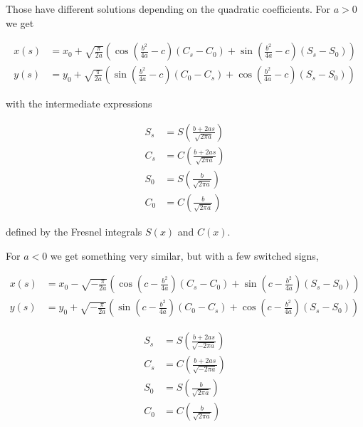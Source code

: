 Those have different solutions depending on the quadratic coefficients.
For $a > 0$ we get

\begin{align}
x(s) &= x_0 + \sqrt{\frac{\pi}{2a}}\left(\cos\left(\frac{b^2}{4a} - c\right)(C_s - C_0) + \sin\left(\frac{b^2}{4a} - c\right)(S_s - S_0)\right) \\
y(s) &= y_0 + \sqrt{\frac{\pi}{2a}}\left(\sin\left(\frac{b^2}{4a} - c\right)(C_0 - C_s) + \cos\left(\frac{b^2}{4a} - c\right)(S_s - S_0)\right)
\end{align}

with the intermediate expressions

\begin{align}
S_s &= S\left(\frac{b + 2as}{\sqrt{2\pi a}}\right) \\
C_s &= C\left(\frac{b + 2as}{\sqrt{2\pi a}}\right) \\
S_0 &= S\left(\frac{b}{\sqrt{2\pi a}}\right) \\
C_0 &= C\left(\frac{b}{\sqrt{2\pi a}}\right)
\end{align}

defined by the Fresnel integrals $S(x)$ and $C(x)$.

For $a < 0$ we get something very similar, but with a few switched signs,

\begin{align}
x(s) &= x_0 - \sqrt{-\frac{\pi}{2a}}\left(\cos\left(c - \frac{b^2}{4a}\right)(C_s - C_0) + \sin\left(c - \frac{b^2}{4a}\right)(S_s - S_0)\right) \\
y(s) &= y_0 + \sqrt{-\frac{\pi}{2a}}\left(\sin\left(c - \frac{b^2}{4a}\right)(C_0 - C_s) + \cos\left(c - \frac{b^2}{4a}\right)(S_s - S_0)\right)
\end{align}

\begin{align}
S_s &= S\left(\frac{b + 2as}{\sqrt{-2\pi a}}\right) \\
C_s &= C\left(\frac{b + 2as}{\sqrt{-2\pi a}}\right) \\
S_0 &= S\left(\frac{b}{\sqrt{2\pi a}}\right) \\
C_0 &= C\left(\frac{b}{\sqrt{2\pi a}}\right)
\end{align}


























